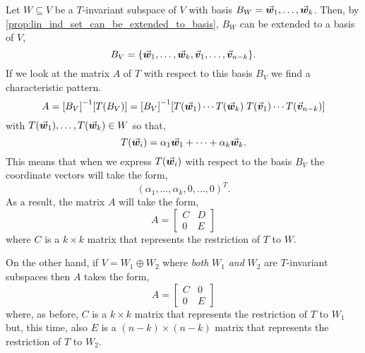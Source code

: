 \documentclass[../MathsNotesBase.tex]{subfiles}
\begin{document}
{		\biggerskip\biggerskip
		Let ${ W \subseteq V }$ be a $T$-invariant subspace of $V$ with basis ${ B_W = \vec{\bm{w}}_1,\dots,\vec{\bm{w}}_k }$. Then, by \autoref{prop:lin_ind_set_can_be_extended_to_basis}, $B_W$ can be extended to a basis of $V$,
		\[ B_V = \{ \vec{\bm{w}}_1,\dots,\vec{\bm{w}}_k, \vec{\bm{v}}_1,\dots,\vec{\bm{v}}_{n-k} \}. \]
		If we look at the matrix $A$ of $T$ with respect to this basis $B_V$ we find a characteristic pattern.
		\[ A = {[B_V]}^{-1}[T(B_V)] = {[B_V]}^{-1}[T(\vec{\bm{w}}_1) \cdots T(\vec{\bm{w}}_k) \; T(\vec{\bm{v}}_1) \cdots T(\vec{\bm{v}}_{n-k})] \]
		with ${ T(\vec{\bm{w}}_1), \dots, T(\vec{\bm{w}}_k) \in W }$ so that,
		\[ T(\vec{\bm{w}}_i) = \alpha_1\vec{\bm{w}}_1 + \cdots + \alpha_k\vec{\bm{w}}_k. \] 
		This means that when we express $T(\vec{\bm{w}}_i)$ with respect to the basis $B_V$ the coordinate vectors will take the form,
		\[ (\alpha_1,\dots,\alpha_k,0,\dots,0)^T. \]
		As a result, the matrix $A$ will take the form,
		\[ A = \begin{bmatrix}
				C & D\\
				0 & E
				\end{bmatrix}\label{eq:invariant_space_block_decomposition}
		\]
		where $C$ is a ${ k \times k }$ matrix that represents the restriction of $T$ to $W$.\\
		
		
		On the other hand, if ${ V = W_1 \oplus W_2 }$ where \textit{both} $W_1$ \textit{and} $W_2$ are $T$-invariant subspaces then $A$ takes the form,
		\[ A = \begin{bmatrix}
				C & 0\\
				0 & E
				\end{bmatrix} 
		\]
		where, as before, $C$ is a ${ k \times k }$ matrix that represents the restriction of $T$ to $W_1$ but, this time, also $E$ is a ${ (n-k) \times (n-k) }$ matrix that represents the restriction of $T$ to $W_2$.
		
		\smallskip{}
	
		\bigskip
	
}
\end{document}
